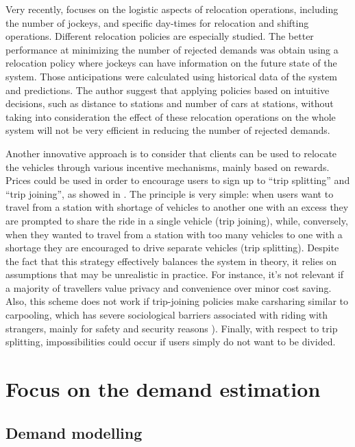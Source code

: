 \begin{bibunit}[ieeetr]
\medskip
Very recently, \cite{zakaria_optimization_2015} focuses on the logistic aspects of relocation operations, including the number of jockeys, and specific day-times for relocation and shifting operations.
Different relocation policies are especially studied.
The better performance at minimizing the number of rejected demands was obtain using a relocation policy where jockeys can have information on the future state of the system.
Those anticipations were calculated using historical data of the system and predictions. %
The author suggest that applying policies based on intuitive decisions, such as distance to stations and number of cars at stations, without taking into consideration the effect of these relocation operations on the whole system will not be very efficient in reducing the number of rejected demands.

\medskip
Another innovative approach is to consider that clients can be used to relocate the vehicles through various incentive mechanisms, mainly based on rewards.
Prices could be used in order to encourage users to sign up to ``trip splitting'' and ``trip joining'', as showed in \cite{barth_user_based_2004}.
The principle is very simple: when users want to travel from a station with shortage of vehicles to another one with an excess they are prompted to share the ride in a single vehicle (trip joining), while, conversely, when they wanted to travel from a station with too many vehicles to one with a shortage they are encouraged to drive separate vehicles (trip splitting).
Despite the fact that this strategy effectively balances the system in theory, it relies on assumptions that may be unrealistic in practice.
For instance, it's not relevant if a majority of travellers value privacy and convenience over minor cost saving.
Also, this scheme does not work if trip-joining policies make carsharing similar to carpooling, which has severe sociological barriers associated with riding with strangers, mainly for safety and security reasons \cite{chan_ridesharing_2012, correia_carpooling_2011}).
Finally, with respect to trip splitting, impossibilities could occur if users simply do not want to be divided.


\newpage
\section{Focus on the demand estimation}





\subsection{Demand modelling}



\end{bibunit}
